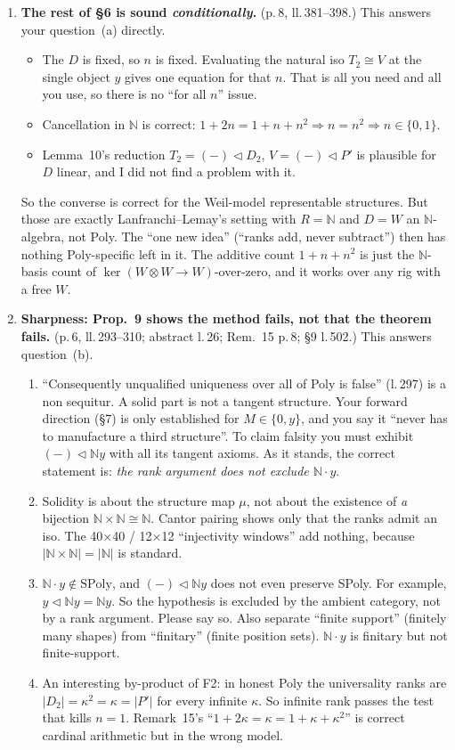 \documentclass[11pt]{article}
\newcommand{\tri}{\mathbin{\triangleleft}}
\newcommand{\N}{\mathbb{N}}
\begin{document}
\begin{enumerate}[label=\textbf{F\arabic*.},leftmargin=*]
\item \textbf{The rest of \S6 is sound \emph{conditionally}.} (p.\,8, ll.\,381--398.) This
answers your question~(a) directly.
\begin{itemize}[leftmargin=1.2em]
\item The $D$ is fixed, so $n$ is fixed. Evaluating the natural iso $T_2\cong V$ at the single
object $y$ gives one equation for that $n$. That is all you need and all you use, so there is no
``for all $n$'' issue.
\item Cancellation in $\N$ is correct: $1+2n=1+n+n^2\Rightarrow n=n^2\Rightarrow n\in\{0,1\}$.
\item Lemma~10's reduction $T_2=(-)\tri D_2$, $V=(-)\tri P'$ is plausible for $D$ linear, and I
did not find a problem with it.
\end{itemize}
So the converse is correct for the Weil-model representable structures. But those are exactly
Lanfranchi--Lemay's setting with $R=\N$ and $D=W$ an $\N$-algebra, not Poly. The ``one new idea''
(``ranks add, never subtract'') then has nothing Poly-specific left in it. The additive count
$1+n+n^2$ is just the $\N$-basis count of $\ker(W\otimes W\to W)$-over-zero, and it works over
any rig with a free $W$.

\item \textbf{Sharpness: Prop.~9 shows the method fails, not that the theorem fails.}
(p.\,6, ll.\,293--310; abstract l.\,26; Rem.~15 p.\,8; \S9 l.\,502.) This answers question~(b).
\begin{enumerate}[label=(\roman*),leftmargin=1.5em]
\item ``Consequently unqualified uniqueness over all of Poly is false'' (l.\,297) is a non
sequitur. A solid part is not a tangent structure. Your forward direction (\S7) is only
established for $M\in\{0,y\}$, and you say it ``never has to manufacture a third structure''.
To claim falsity you must exhibit $(-)\tri\N y$ with all its tangent axioms. As it stands, the
correct statement is: \emph{the rank argument does not exclude $\N\cdot y$}.
\item Solidity is about the structure map $\mu$, not about the existence of \emph{a} bijection
$\N\times\N\cong\N$. Cantor pairing shows only that the ranks admit an iso. The 40$\times$40 /
12$\times$12 ``injectivity windows'' add nothing, because $|\N\times\N|=|\N|$ is standard.
\item $\N\cdot y\notin\mathrm{SPoly}$, and $(-)\tri\N y$ does not even preserve SPoly. For example,
$y\tri\N y=\N y$. So the hypothesis is excluded by the ambient category, not by a rank argument.
Please say so. Also separate ``finite support'' (finitely many shapes) from ``finitary'' (finite
position sets). $\N\cdot y$ is finitary but not finite-support.
\item An interesting by-product of F2: in honest Poly the universality ranks are
$|D_2|=\kappa^2=\kappa=|P'|$ for every infinite $\kappa$. So infinite rank passes the test that
kills $n=1$. Remark~15's ``$1+2\kappa=\kappa=1+\kappa+\kappa^2$'' is correct cardinal arithmetic
but in the wrong model.
\end{enumerate}


\end{enumerate}
\end{document}
